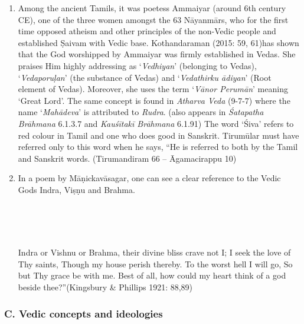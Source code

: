 \begin{enumerate}[{\rm 1.}]
\itemsep=0pt
\item Among the ancient Tamils, it was poetess Ammaiyar (around 6th century CE), one of the three women amongst the 63 Nāyanmārs, who for the first time opposed atheism and other principles of the non-Vedic people and established Ṣaivam with Vedic base. Kothandaraman (2015: 59, 61)has shown that the God worshipped by Ammaiyar was firmly established in Vedas. She praises Him highly addressing as ‘\textit{Vedhiyan}’ (belonging to Vedas), ‘\textit{Vedaporuḷan}’ (the substance of Vedas) and ‘\textit{Vedathirku ādiyan}’ (Root element of Vedas). Moreover, she uses the term ‘\textit{Vānor Perumān}’ meaning ‘Great Lord’. The same concept is found in \textit{Atharva Veda} (9-7-7) where the name ‘\textit{Mahādeva}’ is attributed to \textit{Rudra}. (also appears in \textit{Śatapatha Brāhmana} 6.1.3.7 and \textit{Kauśītakī Brāhmana} 6.1.91) The word ‘Śiva’ refers to red colour in Tamil and one who does good in Sanskrit. Tirumūlar must have referred only to this word when he says, “He is referred to both by the Tamil and Sanskrit words. (Tirumandiram 66 – Āgamacirappu 10)

 \item 
 In a poem by Māṇickavāsagar, one can see a clear reference to the Vedic Gods Indra, Viṣṇu and Brahma.

\begin{myquote}
\\\\\\
\end{myquote}

\begin{myquote}
Indra or Vishnu or Brahma, their divine bliss crave not I; I seek the love of Thy saints, Though my house perish thereby. To the worst hell I will go, So but Thy grace be with me. Best of all, how could my heart think of a god beside thee?”\hfill (Kingsbury \& Phillips 1921: 88,89)
\end{myquote}


\end{enumerate}


\subsubsection*{C. Vedic concepts and ideologies}

